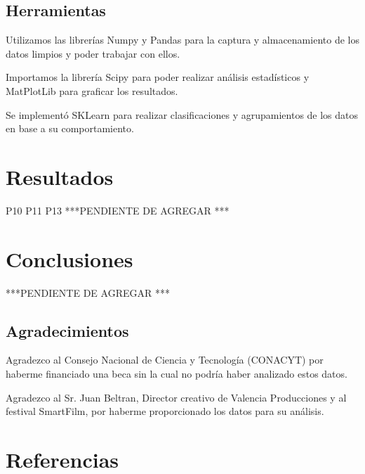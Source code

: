 \documentclass[5p,times]{elsarticle}
\begin{document}
\subsection*{Herramientas}
Utilizamos las librerías Numpy\cite{numpy} y Pandas\cite{pandas} para la captura y almacenamiento de los datos limpios y poder trabajar con ellos.

Importamos la librería Scipy\cite{scipy} para poder realizar análisis estadísticos y MatPlotLib\cite{matplotlib} para graficar los resultados.

Se implementó SKLearn\cite{sklearn} para realizar clasificaciones y agrupamientos de los datos en base a su comportamiento.




\section*{Resultados}
P10
P11
P13
***PENDIENTE DE AGREGAR ***




\section*{Conclusiones}
***PENDIENTE DE AGREGAR ***





\subsection*{Agradecimientos}
Agradezco al Consejo Nacional de Ciencia y Tecnología (CONACYT) por haberme financiado una beca sin la cual no podría haber analizado estos datos.

Agradezco al Sr. Juan Beltran, Director creativo de Valencia Producciones y al festival SmartFilm, por haberme proporcionado los datos para su análisis.

\section*{Referencias}



\end{document}
